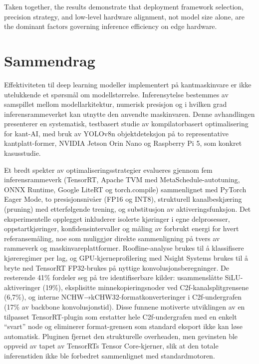 \documentclass[12pt,a4paper]{report}
\begin{document}
Taken together, the results demonstrate that deployment framework selection, precision strategy, and low-level
hardware alignment, not model size alone, are the dominant factors governing inference efficiency on edge
hardware.

\begin{otherlanguage}{norwegian}
\chapter*{Sammendrag}


Effektiviteten til deep learning modeller
implementert på kantmaskinvare er ikke utelukkende et spørsmål om
modellstørrelse. Inferensytelse bestemmes av samspillet mellom
modellarkitektur, numerisk presisjon og i hvilken grad inferensrammeverket kan
utnytte den anvendte maskinvaren. Denne avhandlingen presenterer en
systematisk, testbasert studie av kompilatorbasert optimalisering for kant-AI,
med bruk av YOLOv8n objektdeteksjon på to representative kantplatt-former,
NVIDIA Jetson Orin Nano og Raspberry Pi 5, som konkret kasusstudie.

Et bredt spekter av optimaliseringsstrategier evalueres gjennom fem inferensrammeverk (TensorRT,
Apache TVM med MetaSchedule-autotuning, ONNX Runtime, Google LiteRT og
torch.compile) sammenlignet med PyTorch Eager Mode, to presisjonsnivåer (FP16 og INT8), strukturell
kanalbeskjæring (pruning) med etterfølgende trening, og substitusjon av
aktiveringsfunksjon. Det eksperimentelle opplegget inkluderer isolerte
kjøringer i egne delprosesser, oppstartkjøringer, konfidensintervaller og måling
av forbrukt energi for hvert referansemåling, noe som muliggjør direkte sammenligning
på tvers av rammeverk og maskinvareplattformer. Roofline-analyse brukes til å
klassifisere kjøreregimer per lag, og GPU-kjerneprofilering med Nsight Systems
brukes til å bryte ned TensorRT FP32-brukes på nyttige konvolusjonsberegninger.
De resterende 41\% fordeler seg på tre identifiserbare kilder: usammenslåtte
SiLU-aktiveringer (19\%), eksplisitte minnekopieringsnoder ved
C2f-kanalsplitgrensene (6,7\%), og interne NCHW→kCHW32-formatkonverteringer i
C2f-undergrafen (17\% av backbone konvolusjonstid). Disse funnene motiverte
utviklingen av en tilpasset TensorRT-plugin som erstatter hele C2f-undergrafen
med en enkelt ``svart'' node og eliminerer format-grensen som standard eksport
ikke kan løse automatisk. Pluginen fjernet den strukturelle overheaden, men
gevinsten ble oppveid av tapet av TensorRTs Tensor Core-kjerner, slik at den
totale inferenstiden ikke ble forbedret sammenlignet med standardmotoren.


\end{otherlanguage}
\end{document}
